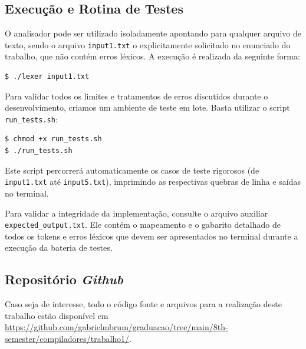 \documentclass[a4paper, 12pt]{article}
\begin{document}
\subsection*{Execução e Rotina de Testes}
O analisador pode ser utilizado isoladamente apontando para qualquer arquivo de texto, sendo o arquivo \texttt{input1.txt} o explicitamente solicitado no enunciado do trabalho, que não contém erros léxicos. A execução é realizada da seguinte forma:
\begin{verbatim}
$ ./lexer input1.txt
\end{verbatim}

Para validar todos os limites e tratamentos de erros discutidos durante o desenvolvimento, criamos um ambiente de teste em lote. Basta utilizar o script \texttt{run\_tests.sh}:
\begin{verbatim}
$ chmod +x run_tests.sh
$ ./run_tests.sh
\end{verbatim}
Este script percorrerá automaticamente os casos de teste rigorosos (de \texttt{input1.txt} até \texttt{input5.txt}), imprimindo as respectivas quebras de linha e saídas no terminal. 

Para validar a integridade da implementação, consulte o arquivo auxiliar \texttt{expected\_output.txt}. Ele contém o mapeamento e o gabarito detalhado de todos os tokens e erros léxicos que devem ser apresentados no terminal durante a execução da bateria de testes.

\subsection*{Repositório \textit{Github}}

Caso seja de interesse, todo o código fonte e arquivos para a realização deste trabalho estão disponível em \url{https://github.com/gabrielmbrum/graduacao/tree/main/8th-semester/compiladores/trabalho1/}.
\end{document}

